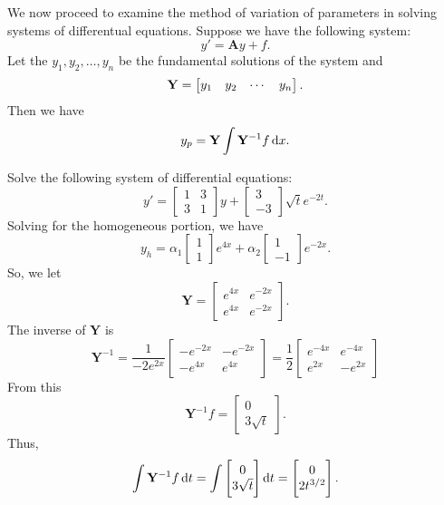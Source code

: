 We now proceed to examine the method of variation of parameters in solving
systems of differentual equations. Suppose we have the following system:
$$y' = \mathbf{A}y + f.$$ Let the $y_1, y_2, \dots, y_n$ be the fundamental
        solutions of the system and $$\bold{Y} = \begin{bmatrix} y_1 & y_2 & \cdots & y_n \end{bmatrix}.$$
        Then we have $$y_p = \mathbf{Y}\int \mathbf{Y}^{-1}f \dif x.$$
\begin{example}
    Solve the following system of differential equations:
    $$y' = \begin{bmatrix} 1 & 3 \\ 3 & 1\end{bmatrix}y+\begin{bmatrix}3 \\ -3 \end{bmatrix}
    \sqrt{t}e^{-2t}.$$ Solving for the homogeneous portion, we have
    $$y_h = \alpha_1 \begin{bmatrix} 1 \\ 1 \end{bmatrix}e^{4x} + \alpha_2
    \begin{bmatrix} 1 \\ -1 \end{bmatrix}e^{-2x}.$$
    So, we let $$\mathbf{Y} = \begin{bmatrix} e^{4x} & e^{-2x} \\ e^{4x} & e^{-2x} \end{bmatrix}.$$
    The inverse of $\mathbf{Y}$ is
    $$\mathbf{Y}^{-1} = \frac{1}{-2e^{2x}} \begin{bmatrix} -e^{-2x} & -e^{-2x} \\ -e^{4x} & e^{4x}\end{bmatrix}
    = \frac{1}{2}\begin{bmatrix} e^{-4x} & e^{-4x} \\ e^{2x} & -e^{2x}\end{bmatrix}$$
    From this $$\mathbf{Y}^{-1}f = \begin{bmatrix} 0 \\ 3\sqrt{t}\end{bmatrix}.$$
    Thus,
    \begin{align*}
        \int \mathbf{Y}^{-1} f \dif t = \int \begin{bmatrix} 0 \\ 3\sqrt{t}\end{bmatrix} \dif t
                                      = \begin{bmatrix} 0 \\ 2t^{3/2}\end{bmatrix}.

\end{align*}
\end{example}
